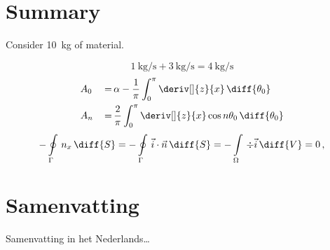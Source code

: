 \chapter*{Summary}

Consider \SI{10}{\kilogram} of material.

\begin{equation}
    \SI{1}{\kilogram\per\second} + \SI{3}{\kilogram\per\second} = \SI{4}{\kilogram\per\second}
\end{equation}
\begin{alignat*}{3}
    &A_0 &\,=\,& \alpha - \frac{1}{\pi}\int_0^\pi \deriv[]{z}{x}\,\diff{\theta_0} \\
    &A_n &\,=\,& \frac{2}{\pi}\int_0^\pi \deriv[]{z}{x}\cos{n\theta_0}\,\diff{\theta_0}
\end{alignat*}
\begin{equation*}
    -\oint\limits_\Gamma\, n_x\,\diff{S} = -\oint\limits_\Gamma\, \Vec{i}\cdot\vec{n}\,\diff{S} = -\int\limits_\Omega\, \div\Vec{i}\,\diff{V} = 0\,,
\end{equation*}

\lipsum[1]









\chapter*{Samenvatting}

{

Samenvatting in het Nederlands\ldots

}

